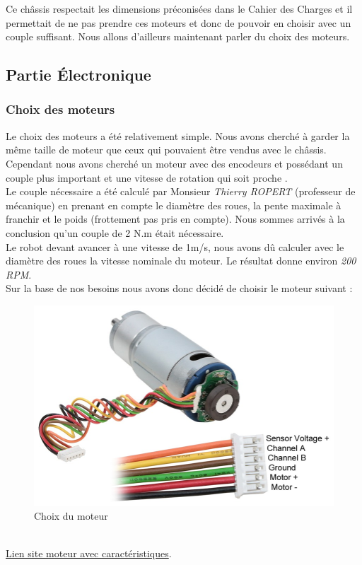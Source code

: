 \documentclass[french]{rapportENSTAB}
\begin{document}
Ce châssis respectait les dimensions préconisées dans le Cahier des Charges et il permettait de ne pas prendre ces moteurs et donc de pouvoir en choisir avec un couple suffisant. Nous allons d'ailleurs maintenant parler du choix des moteurs.\\


\subsection{Partie Électronique}
\subsubsection{Choix des moteurs}
Le choix des moteurs a été relativement simple. Nous avons cherché à garder la même taille de moteur que ceux qui pouvaient être vendus avec le châssis. Cependant nous avons cherché un moteur avec des encodeurs et possédant un couple plus important et une vitesse de rotation qui soit proche . \\

Le couple nécessaire a été calculé par Monsieur \textit{Thierry ROPERT} (professeur de mécanique) en prenant en compte le diamètre des roues, la pente maximale à franchir et le poids (frottement pas pris en compte). Nous sommes arrivés à la conclusion qu'un couple de 2 N.m était nécessaire.\\

Le robot devant avancer à une vitesse de 1m/s, nous avons dû calculer avec le diamètre des roues la vitesse nominale du moteur. Le résultat donne environ \textit{200 RPM}.\\

Sur la base de nos besoins nous avons donc décidé de choisir le moteur suivant : 

\begin{figure}[H]
    \centering
    \includegraphics[scale=0.70]{images/robot/moteur.png}
    \caption{Choix du moteur}
    \label{fig:cdcf}
\end{figure}\\ 
\href{https://www.servocity.com/313-rpm-hd-premium-planetary-gear-motor-w-encoder}{Lien site moteur avec caractéristiques}.\\
\end{document}
